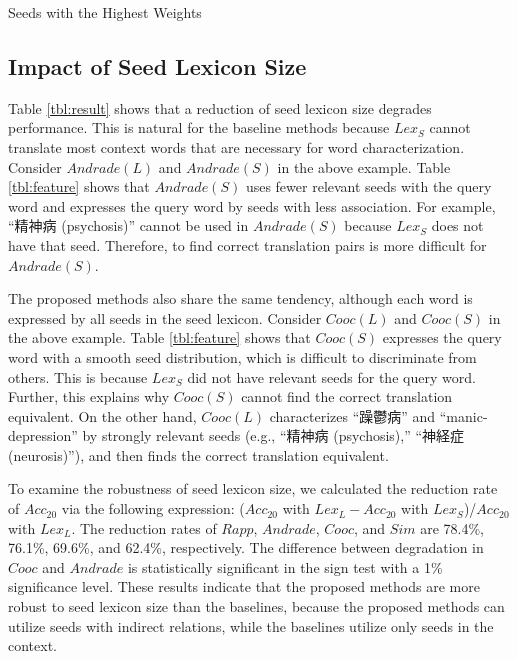 \documentclass[english]{jnlp_1.4}
\begin{document}
\begin{table}[t]
\caption{Seeds with the Highest Weights}
\label{tbl:feature}

\end{table}



\subsection{Impact of Seed Lexicon Size}
\label{sect:seedsize}

Table \ref{tbl:result} shows that a reduction of seed lexicon size degrades performance. 
This is natural for the baseline methods because $\mathit{Lex}_{S}$ cannot translate most context words that are necessary for word characterization. 
Consider $\mathit{Andrade}(L)$ and $\mathit{Andrade}(S)$ in the above example. 
\mbox{Table} \ref{tbl:feature} shows that $\mathit{Andrade}(S)$ uses fewer relevant seeds with the query word and expresses the query word by seeds with less association. 
For example, ``精神病 (psychosis)'' cannot be used in $\mathit{Andrade}(S)$ because $\mathit{Lex}_{S}$ does not have that seed. 
Therefore, to find correct translation pairs is more difficult for $\mathit{Andrade}(S)$. 

The proposed methods also share the same tendency, although each word is expressed by all seeds in the seed lexicon. 
Consider $\mathit{Cooc}(L)$ and $\mathit{Cooc}(S)$ in the above example. 
Table \ref{tbl:feature} shows that $\mathit{Cooc}(S)$ expresses the query word with a smooth seed distribution, which is difficult to discriminate from others.  
This is because $\mathit{Lex}_{S}$ did not have relevant seeds for the query word. 
Further, this explains why $\mathit{Cooc}(S)$ cannot find the correct translation equivalent. 
On the other hand, $\mathit{Cooc}(L)$ characterizes ``躁鬱病'' and ``manic-depression'' by strongly relevant seeds (e.g., ``精神病 (psychosis),'' ``神経症 (neurosis)''), and then finds the correct translation equivalent. 

To examine the robustness of seed lexicon size, we calculated the reduction rate of $\mathit{Acc}_{20}$ via the following expression: ($\mathit{Acc}_{20}$ with $\mathit{Lex}_{L} - \mathit{Acc}_{20}$ with $\mathit{Lex}_{S}$)/$\mathit{Acc}_{20}$ with $\mathit{Lex}_{L}$. 
The reduction rates of $\mathit{Rapp}$, $\mathit{Andrade}$, $\mathit{Cooc}$, and $\mathit{Sim}$ are 78.4\%, 76.1\%, 69.6\%, and 62.4\%, respectively. 
The difference between degradation in $\mathit{Cooc}$ and $\mathit{Andrade}$ is statistically significant in the sign test with a 1\% significance level. 
These results indicate that the proposed methods are more robust to seed lexicon size than the baselines, because the proposed methods can utilize seeds with indirect relations, while the baselines utilize only seeds in the context. 
\end{document}
